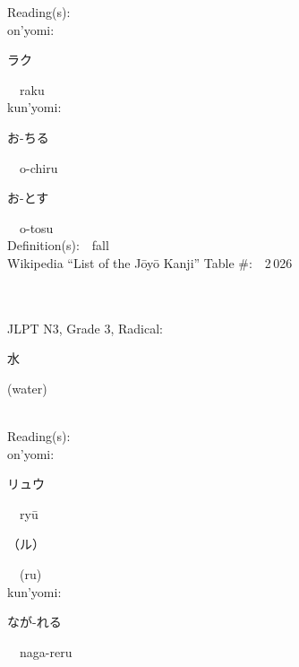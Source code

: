 \begin{multicols}{2}
Reading(s):\ \ \\
{\hspace*{1em}}on'yomi:\ \ \\
{\hspace*{2em}}{\begin{CJK}{UTF8}{min} ラク \end{CJK}}\ \ raku\ \ \\
{\hspace*{1em}}kun'yomi:\ \ \\
{\hspace*{2em}}{\begin{CJK}{UTF8}{min} お-ちる \end{CJK}}\ \ o-chiru\ \ \\
{\hspace*{2em}}{\begin{CJK}{UTF8}{min} お-とす \end{CJK}}\ \ o-tosu\ \ \\
Definition(s):\ \ fall \\
Wikipedia ``List of the J\=oy\=o Kanji'' Table \#:\ \ 2\,026 \\
\ \ \\
{\fontsize{34pt}{40pt}  }\ \ \\  %
{JLPT N3, Grade 3, Radical:\ \ {\begin{CJK}{UTF8}{min} 水 \end{CJK}} (water) } \\
Reading(s):\ \ \\
{\hspace*{1em}}on'yomi:\ \ \\
{\hspace*{2em}}{\begin{CJK}{UTF8}{min} リュウ \end{CJK}}\ \ ry\=u\ \ \\
{\hspace*{2em}}{\begin{CJK}{UTF8}{min} （ル） \end{CJK}}\ \ (ru)\ \ \\
{\hspace*{1em}}kun'yomi:\ \ \\
{\hspace*{2em}}{\begin{CJK}{UTF8}{min} なが-れる \end{CJK}}\ \ naga-reru\ \ \\

\end{multicols}
